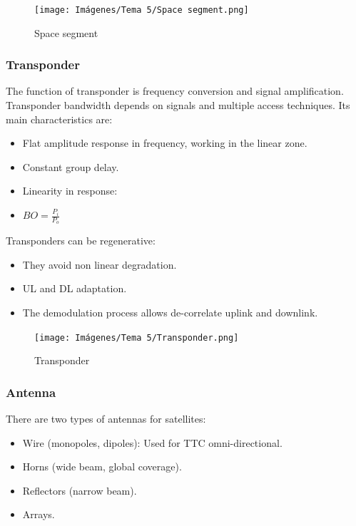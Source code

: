 \documentclass[
	12pt,
	twoside
]{book}
\begin{document}
\begin{figure}[H]
	\centering
	\texttt{[image: Imágenes/Tema 5/Space segment.png]}
	\caption{
		\label{fig:unit5_space_segment}
		Space segment
	}
\end{figure}

\subsubsection{Transponder}

The function of transponder is frequency conversion and signal amplification. Transponder bandwidth depends on signals and multiple access techniques. Its main characteristics are:
\begin{itemize}
	\item Flat amplitude response in frequency, working in the linear zone.
	\item Constant group delay.
	\item Linearity in response:
	\item $BO = \frac {P_i} {P_o}$
\end{itemize}

Transponders can be regenerative:
\begin{itemize}
	\item They avoid non linear degradation.
	\item UL and DL adaptation.
	\item The demodulation process allows de-correlate uplink and downlink.
\end{itemize}

\begin{figure}[H]
	\centering
	\texttt{[image: Imágenes/Tema 5/Transponder.png]}
	\caption{
		\label{fig:unit5_transponder}
		Transponder
	}
\end{figure}

\subsubsection{Antenna}

There are two types of antennas for satellites:
\begin{itemize}
	\item Wire (monopoles, dipoles): Used for TTC omni-directional.
	\item Horns (wide beam, global coverage).
	\item Reflectors (narrow beam).
	\item Arrays.
\end{itemize}
\end{document}
